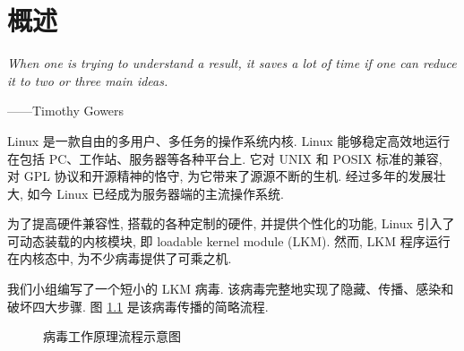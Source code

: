 \documentclass[11pt,fleqn]{book} %
\begin{document}


\chapter{概述}



\vspace*{2cm}

\textit{When one is trying to understand a result, it saves a lot
of time if one can reduce it to two or three main ideas.}

\begin{flushright}
——Timothy Gowers
\par\end{flushright}

\newpage{}

Linux 是一款自由的多用户、多任务的操作系统内核. Linux 能够稳定高效地运行在包括 PC、工作站、服务器等各种平台上. 它对
UNIX 和 POSIX 标准的兼容, 对 GPL 协议和开源精神的恪守, 为它带来了源源不断的生机. 经过多年的发展壮大, 如今
Linux 已经成为服务器端的主流操作系统.

为了提高硬件兼容性, 搭载的各种定制的硬件, 并提供个性化的功能, Linux 引入了可动态装载的内核模块, 即 loadable
kernel module (LKM). 然而, LKM 程序运行在内核态中, 为不少病毒提供了可乘之机.

我们小组编写了一个短小的 LKM 病毒. 该病毒完整地实现了隐藏、传播、感染和破坏四大步骤. 图 \ref{fig:=0075C5=006BD2=005DE5=004F5C=00539F=007406=006D41=007A0B=00793A=00610F=0056FE}
是该病毒传播的简略流程.

\begin{figure}[H]
\vspace*{2cm}


\caption{病毒工作原理流程示意图\label{fig:=0075C5=006BD2=005DE5=004F5C=00539F=007406=006D41=007A0B=00793A=00610F=0056FE}}


\vspace*{1cm}
\end{figure}
\end{document}
